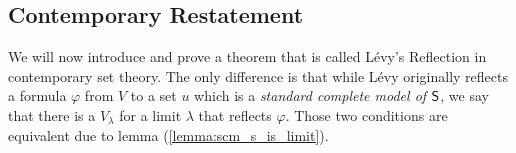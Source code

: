 
\subsection{Contemporary Restatement}
We will now introduce and prove a theorem that is called Lévy's Reflection in contemporary set theory. The only difference is that while Lévy originally reflects a formula $\varphi$ from $V$ to a set $u$ which is a \emph{standard complete model of $\sf{S}$}, we say that there is a $V_\lambda$ for a limit $\lambda$ that reflects $\varphi$. Those two conditions are equivalent due to lemma (\ref{lemma:scm_s_is_limit}).





